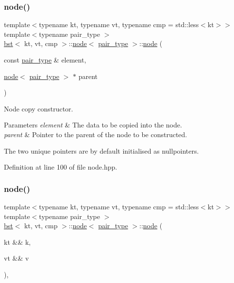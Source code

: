 \subsubsection{\texorpdfstring{node()}{node()}\hspace{0.1cm}{\footnotesize\ttfamily [4/5]}}
{\footnotesize\ttfamily template$<$typename kt, typename vt, typename cmp = std\+::less$<$kt$>$$>$ \\
template$<$typename pair\+\_\+type $>$ \\
\hyperlink{classbst}{bst}$<$ kt, vt, cmp $>$\+::\hyperlink{structbst_1_1node}{node}$<$ \hyperlink{classbst_a7b11cca2a3b4394915600194f741ab16}{pair\+\_\+type} $>$\+::\hyperlink{structbst_1_1node}{node} (\begin{DoxyParamCaption}\item[{const \hyperlink{classbst_a7b11cca2a3b4394915600194f741ab16}{pair\+\_\+type} \&}]{element,  }\item[{\hyperlink{structbst_1_1node}{node}$<$ \hyperlink{classbst_a7b11cca2a3b4394915600194f741ab16}{pair\+\_\+type} $>$ $\ast$}]{parent }\end{DoxyParamCaption})\hspace{0.3cm}{\ttfamily [inline]}}



Node copy constructor. 


\begin{DoxyParams}{Parameters}
{\em element} & The data to be copied into the node. \\
\hline
{\em parent} & Pointer to the parent of the node to be constructed.\\
\hline
\end{DoxyParams}
The two unique pointers are by default initialised as nullpointers. 

Definition at line 100 of file node.\+hpp.

\mbox{\label{structbst_1_1node_a16fb9a6092d387f08864f4c75ca312bb}} 
\subsubsection{\texorpdfstring{node()}{node()}\hspace{0.1cm}{\footnotesize\ttfamily [5/5]}}
{\footnotesize\ttfamily template$<$typename kt, typename vt, typename cmp = std\+::less$<$kt$>$$>$ \\
template$<$typename pair\+\_\+type $>$ \\
\hyperlink{classbst}{bst}$<$ kt, vt, cmp $>$\+::\hyperlink{structbst_1_1node}{node}$<$ \hyperlink{classbst_a7b11cca2a3b4394915600194f741ab16}{pair\+\_\+type} $>$\+::\hyperlink{structbst_1_1node}{node} (\begin{DoxyParamCaption}\item[{kt \&\&}]{k,  }\item[{vt \&\&}]{v }\end{DoxyParamCaption})\hspace{0.3cm}{\ttfamily [inline]}, {\ttfamily [noexcept]}}



